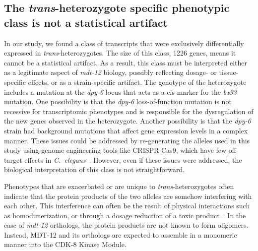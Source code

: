 \documentclass[10pt, twocolumn]{article}
\newcommand{\cel}{\emph{C.~elegans}}
\newcommand{\gene}[1]{\mbox{\emph{#1}}}
\newcommand{\protein}[1]{\mbox{\uppercase{#1}}}
\newcommand{\dpy}{\gene{mdt-12}}
\begin{document}

\subsection*{The \emph{trans}-heterozygote specific phenotypic class is not a
             statistical artifact}
In our study, we found a class of transcripts that were exclusively
differentially expressed in \emph{trans}-heterozygotes. The size of this class,
1226 genes, means it cannot be a statistical artifact. As a result, this class
must be interpreted either as a legitimate aspect of \dpy{} biology, possibly
reflecting dosage- or tissue-specific effects, or as a strain-specific artifact.
The genotype of the heterozygote includes a mutation at the \gene{dpy-6} locus
that acts as a cis-marker for the \emph{bx93} mutation. One possibility is that
the \emph{dpy-6} loss-of-function mutation is not recessive for transcriptomic
phenotypes and is responsible for the dysregulation of the new genes observed in
the heterozygote. Another possibility is that the \emph{dpy-6} strain had
background mutations that affect gene expression levels in a complex manner.
These issues could be addressed by re-generating the alleles used in this study
using genome engineering tools like CRISPR Cas9, which have few off-target
effects in \cel{}~\cite{Chiu2013}. However, even if these issues were addressed,
the biological interpretation of this class is not straightforward.

Phenotypes that are exacerbated or are unique to \emph{trans}-heterozygotes
often indicate that the protein products of the two alleles are somehow
interfering with each other. This interference can often be the result of
physical interactions such as homodimerization, or through a dosage reduction of
a toxic product~\cite{Yook2005}. In the case of \dpy{} orthologs, the protein
products are not known to form oligomers. Instead, \protein{mdt-12} and its
orthologs are expected to assemble in a monomeric manner into the
\protein{cdk-8} Kinase Module.
\end{document}
